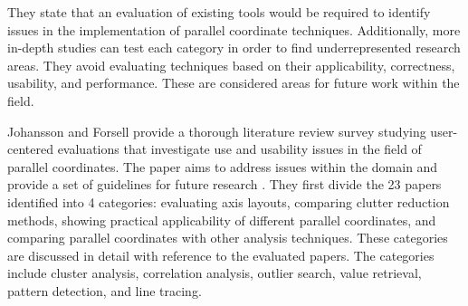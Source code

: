 %
%
%

They state that an evaluation of existing tools would be required to identify issues in the implementation of parallel coordinate techniques. Additionally, more in-depth studies can test each category in order to find underrepresented research areas. They avoid evaluating techniques based on their applicability, correctness, usability, and performance. These are considered areas for future work within the field.

Johansson and Forsell provide a thorough literature review survey studying user-centered evaluations that investigate use and usability issues in the field of parallel coordinates. The paper aims to address issues within the domain and provide a set of guidelines for future research \cite{johansson2016evaluation}.
They first divide the 23 papers identified into 4 categories: evaluating axis layouts, comparing clutter reduction methods, showing practical applicability of different parallel coordinates, and comparing parallel coordinates with other analysis techniques. These categories are discussed in detail with reference to the evaluated papers.  The categories include cluster analysis, correlation analysis, outlier search, value retrieval, pattern detection, and line tracing.

